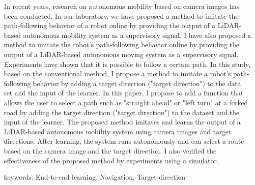 In recent years, research on autonomous mobility based on camera images has been conducted.
In our laboratory, we have proposed a method to imitate the path-following behavior of a robot online by providing the output of a LiDAR-based autonomous mobility system as a supervisory signal. I have also proposed a method to imitate the robot's path-following behavior online by providing the output of a LiDAR-based autonomous moving system as a supervisory signal, Experiments have shown that it is possible to follow a certain path.
In this study, based on the conventional method, I propose a method to imitate a robot's path-following behavior by adding a target direction ("target direction") to the data set and the input of the learner. 
In this paper, I propose to add a function that allows the user to select a path such as "straight ahead" or "left turn" at a forked road by adding the target direction ("target direction") to the dataset and the input of the learner.
The proposed method imitates and learns the output of a LiDAR-based autonomous mobility system using camera images and target directions.
After learning, the system runs autonomously and can select a route based on the camera image and the target direction.
I also verified the effectiveness of the proposed method by experiments using a simulator. 


keywords: End-to-end learning, Navigation, Target direction
